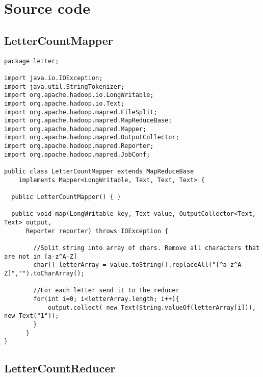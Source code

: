 \documentclass[10pt, a4paper]{article}
\begin{document}

\newpage
\section{Source code} %

\subsection{LetterCountMapper} %
\label{sub:lettercountmapper}
\begin{lstlisting}
package letter;

import java.io.IOException;
import java.util.StringTokenizer;
import org.apache.hadoop.io.LongWritable;
import org.apache.hadoop.io.Text;
import org.apache.hadoop.mapred.FileSplit;
import org.apache.hadoop.mapred.MapReduceBase;
import org.apache.hadoop.mapred.Mapper;
import org.apache.hadoop.mapred.OutputCollector;
import org.apache.hadoop.mapred.Reporter;
import org.apache.hadoop.mapred.JobConf;

public class LetterCountMapper extends MapReduceBase
    implements Mapper<LongWritable, Text, Text, Text> {

  public LetterCountMapper() { }

  public void map(LongWritable key, Text value, OutputCollector<Text, Text> output,
      Reporter reporter) throws IOException {
	    
	    //Split string into array of chars. Remove all characters that are not in [a-z^A-Z]  
	    char[] letterArray = value.toString().replaceAll("[^a-z^A-Z]","").toCharArray();
	   
	    //For each letter send it to the reducer
	    for(int i=0; i<letterArray.length; i++){
	    	output.collect( new Text(String.valueOf(letterArray[i])), new Text("1"));
	    }
	  }
}  
\end{lstlisting}


\newpage
\subsection{LetterCountReducer} %
\label{sub:lettercountreducer}
\end{document}
